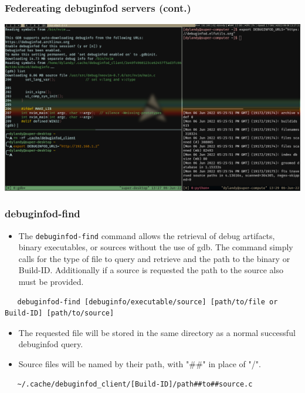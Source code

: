 \documentclass[12pt]{beamer}
\begin{document}
\begin{frame}
   \frametitle{ Federeating debuginfod servers (cont.) }
   \begin{center}
   \includegraphics[scale=.175]{federated_ss.png}
   \end{center}
\end{frame}
\begin{frame}[fragile]
   \frametitle{ debuginfod-find}
   \begin{itemize}
      \item The \color{gray}\verb|debuginfod-find| \color{black}command allows the retrieval of debug artifacts, binary 
   executables, or sources without the use of gdb. The command simply calls for the type of file to 
   query and retrieve and the path to the binary or Build-ID. Additionally if a source is requested
   the path to the source also must be provided.
   \end{itemize}
   \fontsize{7pt}{10pt}\selectfont
   \color{gray}
   \begin{verbatim}
   debuginfod-find [debuginfo/executable/source] [path/to/file or Build-ID] [path/to/source]
   \end{verbatim}
   \fontsize{10pt}{10pt}\selectfont
   \begin{itemize}
      \item The requested file will be stored in the same directory as a normal successful 
         debuginfod query.
      \item Source files will be named by their path, with "\#\#" in place of "\//".
   \end{itemize}
   \color{gray}
   \begin{verbatim}
   ~/.cache/debuginfod_client/[Build-ID]/path##to##source.c
   \end{verbatim}

\end{frame}
\end{document}
